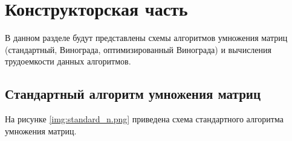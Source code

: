 \chapter{Конструкторская часть}
В данном разделе будут представлены схемы алгоритмов умножения матриц (стандартный, Винограда, оптимизированный Винограда) и вычисления трудоемкости данных алгоритмов.
 

\section{Стандартный алгоритм умножения матриц}

На рисунке \ref{img:standard_n.png} приведена схема стандартного алгоритма умножения матриц.
\\
\\
\\
\\
\\
\\
\\
\\
\\
\\
\\
\\
\\
\\
\\
\\
\\
\\
\\
\\
\\
\\



\FloatBarrier
